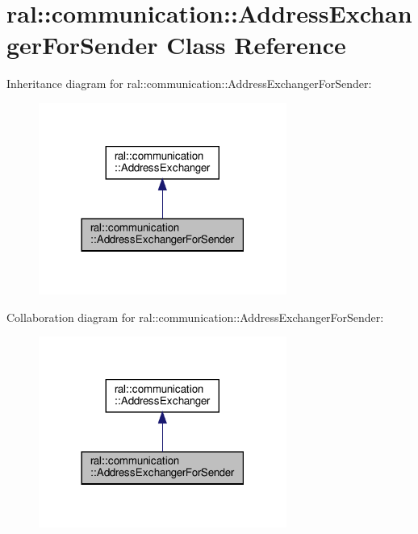 \hypertarget{classral_1_1communication_1_1AddressExchangerForSender}{}\section{ral\+:\+:communication\+:\+:Address\+Exchanger\+For\+Sender Class Reference}
\label{classral_1_1communication_1_1AddressExchangerForSender}


Inheritance diagram for ral\+:\+:communication\+:\+:Address\+Exchanger\+For\+Sender\+:\nopagebreak
\begin{figure}[H]
\begin{center}
\leavevmode
\includegraphics[width=230pt]{classral_1_1communication_1_1AddressExchangerForSender__inherit__graph}
\end{center}
\end{figure}


Collaboration diagram for ral\+:\+:communication\+:\+:Address\+Exchanger\+For\+Sender\+:\nopagebreak
\begin{figure}[H]
\begin{center}
\leavevmode
\includegraphics[width=230pt]{classral_1_1communication_1_1AddressExchangerForSender__coll__graph}
\end{center}
\end{figure}

